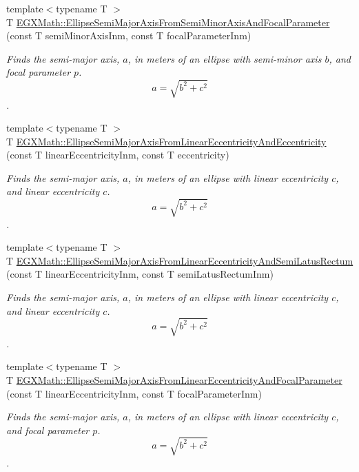 \begin{DoxyCompactItemize}
{\footnotesize template$<$typename T $>$ }\\T \mbox{\hyperlink{group___e_g_x_math-_geometry-2_d-_ellipse-_semi_major_axis_ga8d8abd93ee6cdf43ba490874218f925f}{E\+G\+X\+Math\+::\+Ellipse\+Semi\+Major\+Axis\+From\+Semi\+Minor\+Axis\+And\+Focal\+Parameter}} (const T semi\+Minor\+Axis\+Inm, const T focal\+Parameter\+Inm)
\begin{DoxyCompactList}\small\item\em Finds the semi-\/major axis, $a$, in meters of an ellipse with semi-\/minor axis $b$, and focal parameter $p$. \[ a=\sqrt{b^2+c^2} \]. \end{DoxyCompactList}\item 
{\footnotesize template$<$typename T $>$ }\\T \mbox{\hyperlink{group___e_g_x_math-_geometry-2_d-_ellipse-_semi_major_axis_gaf013b5a5e305696948669e348c7dd1c1}{E\+G\+X\+Math\+::\+Ellipse\+Semi\+Major\+Axis\+From\+Linear\+Eccentricity\+And\+Eccentricity}} (const T linear\+Eccentricity\+Inm, const T eccentricity)
\begin{DoxyCompactList}\small\item\em Finds the semi-\/major axis, $a$, in meters of an ellipse with linear eccentricity $c$, and linear eccentricity $c$. \[ a=\sqrt{b^2+c^2} \]. \end{DoxyCompactList}\item 
{\footnotesize template$<$typename T $>$ }\\T \mbox{\hyperlink{group___e_g_x_math-_geometry-2_d-_ellipse-_semi_major_axis_gad5fde13ad96aede92a1c476d373bc295}{E\+G\+X\+Math\+::\+Ellipse\+Semi\+Major\+Axis\+From\+Linear\+Eccentricity\+And\+Semi\+Latus\+Rectum}} (const T linear\+Eccentricity\+Inm, const T semi\+Latus\+Rectum\+Inm)
\begin{DoxyCompactList}\small\item\em Finds the semi-\/major axis, $a$, in meters of an ellipse with linear eccentricity $c$, and linear eccentricity $c$. \[ a=\sqrt{b^2+c^2} \]. \end{DoxyCompactList}\item 
{\footnotesize template$<$typename T $>$ }\\T \mbox{\hyperlink{group___e_g_x_math-_geometry-2_d-_ellipse-_semi_major_axis_gad77cbdb5c764cb11bc79a7373d0b6881}{E\+G\+X\+Math\+::\+Ellipse\+Semi\+Major\+Axis\+From\+Linear\+Eccentricity\+And\+Focal\+Parameter}} (const T linear\+Eccentricity\+Inm, const T focal\+Parameter\+Inm)
\begin{DoxyCompactList}\small\item\em Finds the semi-\/major axis, $a$, in meters of an ellipse with linear eccentricity $c$, and focal parameter $p$. \[ a=\sqrt{b^2+c^2} \]. \end{DoxyCompactList}\item 

\end{DoxyCompactItemize}

